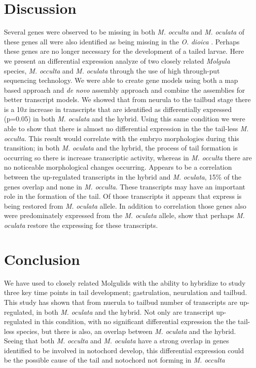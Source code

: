 \section{Discussion}
Several genes were observed to be missing in both \textit{M. occulta} and \textit{M. oculata} of these genes all were also identified as being missing in the \textit{O. dioica} \cite{kugler_evolutionary_2011}. Perhaps these genes are no longer necessary for the development of a tailed larvae.
Here we present an differential expression analyze of two closely related \textit{Molgula} species, \textit{M. occulta} and \textit{M. oculata} through the use of high through-put sequencing technology. We were able to create gene models using both a map based approach and \textit{de novo} assembly approach and combine the assemblies for better transcript models. We showed that from neurula to the tailbud stage there is a 10\textit{x} increase in transcripts that are identified as differentially expressed (p=0.05) in both \textit{M. oculata} and the hybrid. Using this same condition we were able to show that there is almost no differential expression in the the tail-less \textit{M. occulta}. This result would correlate with the embryo morphologies during this transition; in both  \textit{M. oculata} and the hybrid, the process of tail formation is occurring so there is increase transcriptic activity, whereas in \textit{M. occulta} there are no noticeable morphological changes occurring. Appears to be a correlation between the up-regulated transcripts in the hybrid and \textit{M. oculata}, 15\% of the genes overlap and none in \textit{M. occulta}. These transcripts may have an important role in the formation of the tail. Of those transcripts it appears that express is being restored from \textit{M. oculata} allele. In addition to correlation those genes also were predominately expressed from the \textit{M. oculata} allele, show that perhaps \textit{M. oculata} restore the expressing for these transcripts.

\section{Conclusion}
We have used to closely related Molgulids with the ability to hybridize to study three key time points in tail development; gastrulation, neurulation and tailbud. This study has shown that from nuerula to tailbud number of transcripts are up-regulated, in both \textit{M. oculata} and the hybrid. Not only are transcript up-regulated in this condition, with no significant differential expression the the tail-less species, but there is also, an overlap between \textit{M. oculata} and the hybrid. Seeing that both \textit{M. occulta} and \textit{M. oculata} have a strong overlap in genes identified to be involved in notochord develop, this differential expression could be the possible cause of the tail and notochord not forming in \textit{M. occulta}
